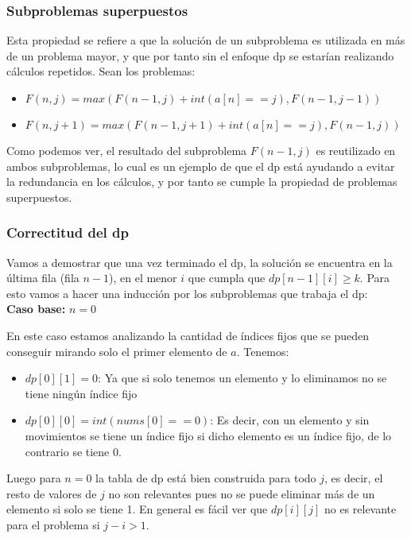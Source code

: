 \documentclass[11pt]{article}
\begin{document}
    \subsubsection{Subproblemas superpuestos}
    Esta propiedad se refiere a que la solución de un subproblema es utilizada en más de un problema mayor, y que por
    tanto sin el enfoque dp se estarían realizando cálculos repetidos. Sean los problemas:

    \begin{itemize}
        \item $F(n, j) = max(F(n-1, j) + int(a[n] == j), F(n-1, j-1))$
        \item$F(n, j+1) = max(F(n-1, j+1) + int(a[n] == j), F(n-1, j))$
    \end{itemize}

    Como podemos ver, el resultado del subproblema $F(n-1, j)$ es reutilizado en ambos subproblemas, lo cual es un
    ejemplo de que el dp está ayudando a evitar la redundancia en los cálculos, y por tanto se cumple la propiedad de
    problemas superpuestos.

    \subsubsection{Correctitud del dp}
    Vamos a demostrar que una vez terminado el dp, la solución se encuentra en la última fila (fila $n-1$), en el menor $i$
    que cumpla que $dp[n-1][i] \geq k$. Para esto vamos a hacer una inducción por los subproblemas que trabaja el
    dp:\\[10pt]

    \textbf{Caso base:} $n=0$

    En este caso estamos analizando la cantidad de índices fijos que se pueden conseguir mirando solo el primer
    elemento de $a$. Tenemos:

    \begin{itemize}
        \item $dp[0][1] = 0$: Ya que si solo tenemos un elemento y lo eliminamos no se tiene ningún índice fijo
        \item $dp[0][0] = int(nums[0] == 0)$: Es decir, con un elemento y sin movimientos se tiene un índice fijo
              si dicho elemento es un índice fijo, de lo contrario se tiene 0.
    \end{itemize}

    Luego para $n=0$ la tabla de dp está bien construida para todo $j$, es decir, el resto de valores de $j$ no
    son relevantes pues no se puede eliminar más de un elemento si solo se tiene 1. En general es fácil ver que
    $dp[i][j]$ no es relevante para el problema si $j - i > 1$.\\[10pt]
\end{document}
